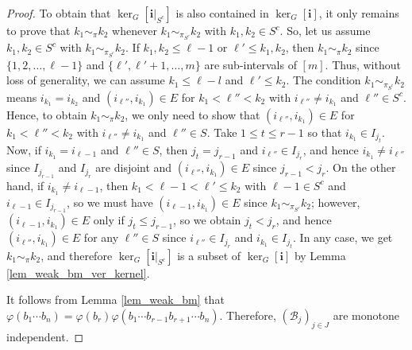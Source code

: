 \documentclass[a4paper,12pt]{extarticle}
\theoremstyle{definition}
\theoremstyle{remark}
\begin{document}
\begin{proof}
	To obtain that $\ker_G[\bm{i}|_{S^c}]$ is also contained in $\ker_G[\bm{i}]$, it only remains to prove that $k_1 \sim_\pi k_2$ whenever $k_1 \sim_{\pi_{S^c}} k_2$ with $k_1,k_2 \in S^c$. 
	So, let us assume $k_1,k_2 \in S^c$ with $k_1 \sim_{\pi_{S^c}} k_2$. 
	If $k_1 , k_2 \leq \ell-1$ or $\ell' \leq k_1,k_2$, then $k_1 \sim_\pi k_2$ since $\{1,2,\ldots,\ell-1\}$ and $\{\ell',\ell'+1,\ldots,m\}$ are sub-intervals of $[m]$. 
	Thus, without loss of generality, we can assume $k_1 \leq \ell-l$ and $\ell' \leq k_2$.
	The condition $k_1 \sim_{\pi_{S^c}} k_2$ means $i_{k_1} = i_{k_2}$ and $(i_{\ell''},i_{k_1}) \in E$ for $k_1 < \ell'' < k_2$ with $i_{\ell''} \neq i_{k_1}$ and $\ell'' \in S^c$. 
	Hence, to obtain $k_1 \sim_\pi k_2$, we only need to show that $(i_{\ell''},i_{k_1}) \in E$ for $k_1 < \ell'' < k_2$ with $i_{\ell''} \neq i_{k_1}$ and $\ell'' \in S$. 
	Take $1 \leq t \leq r-1$ so that $i_{k_1} \in I_{j_{t}} $. 
	Now, if $i_{k_1} = i_{\ell-1}$ and $\ell'' \in S$, then $j_t = j_{r-1}$ and $i_{\ell''} \in I_{j_{r}}$, and hence $i_{k_1}\neq i_{\ell''}$ since $I_{j_{r-1}}$ and $I_{j_{r}}$ are disjoint and $(i_{\ell''},i_{k_1}) \in E$ since $j_{r-1} < j_r$.
	On the other hand, if $i_{k_1} \neq i_{\ell-1}$, then $k_1 < \ell -1 < \ell' \leq k_2$ with $\ell - 1 \in S^c$ and $i_{\ell-1} \in I_{j_{r-1}}$, so we must have  $(i_{\ell-1},i_{k_1}) \in E$ since  $k_1 \sim_{\pi_{S^c}} k_2$; however, $(i_{\ell-1},i_{k_1}) \in E$  only if $j_t \leq j_{r-1}$, so we obtain $j_t < j_r$, and hence  $(i_{\ell''},i_{k_1}) \in E$  for any $\ell'' \in S$ since $i_{\ell''} \in I_{j_{r}}$ and $i_{k_1} \in I_{j_t}$. 
	In any case, we get $k_1 \sim_\pi k_2$, and therefore $\ker_G[\bm{i}|_{S^c}]$ is a subset of  $\ker_G[\bm{i}]$ by Lemma \ref{lem_weak_bm_ver_kernel}. 
	
	It follows from Lemma \ref{lem_weak_bm} that $\varphi(b_1 \cdots b_n) = \varphi(b_r)  \varphi(b_1 \cdots b_{r-1}b_{r+1}\cdots b_n)$. 
	Therefore,  $(\mathcal{B}_j)_{j \in J}$ are monotone independent. 
\end{proof}
\end{document}
